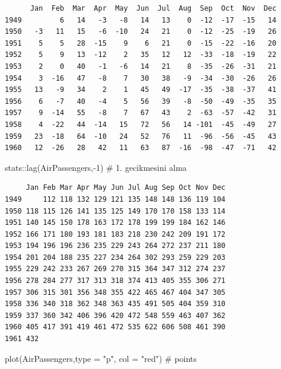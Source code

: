 \documentclass[
  letterpaper,
  DIV=11,
  numbers=noendperiod]{scrreprt}
\newenvironment{Shaded}{\begin{snugshade}}{\end{snugshade}}
\newcommand{\AttributeTok}[1]{\textcolor[rgb]{0.40,0.45,0.13}{#1}}
\newcommand{\CommentTok}[1]{\textcolor[rgb]{0.37,0.37,0.37}{#1}}
\newcommand{\DecValTok}[1]{\textcolor[rgb]{0.68,0.00,0.00}{#1}}
\newcommand{\FunctionTok}[1]{\textcolor[rgb]{0.28,0.35,0.67}{#1}}
\newcommand{\NormalTok}[1]{\textcolor[rgb]{0.00,0.23,0.31}{#1}}
\newcommand{\SpecialCharTok}[1]{\textcolor[rgb]{0.37,0.37,0.37}{#1}}
\newcommand{\StringTok}[1]{\textcolor[rgb]{0.13,0.47,0.30}{#1}}
\begin{document}
\begin{verbatim}
      Jan  Feb  Mar  Apr  May  Jun  Jul  Aug  Sep  Oct  Nov  Dec
1949         6   14   -3   -8   14   13    0  -12  -17  -15   14
1950   -3   11   15   -6  -10   24   21    0  -12  -25  -19   26
1951    5    5   28  -15    9    6   21    0  -15  -22  -16   20
1952    5    9   13  -12    2   35   12   12  -33  -18  -19   22
1953    2    0   40   -1   -6   14   21    8  -35  -26  -31   21
1954    3  -16   47   -8    7   30   38   -9  -34  -30  -26   26
1955   13   -9   34    2    1   45   49  -17  -35  -38  -37   41
1956    6   -7   40   -4    5   56   39   -8  -50  -49  -35   35
1957    9  -14   55   -8    7   67   43    2  -63  -57  -42   31
1958    4  -22   44  -14   15   72   56   14 -101  -45  -49   27
1959   23  -18   64  -10   24   52   76   11  -96  -56  -45   43
1960   12  -26   28   42   11   63   87  -16  -98  -47  -71   42
\end{verbatim}

\begin{Shaded}
\begin{Highlighting}[]
\NormalTok{stats}\SpecialCharTok{::}\FunctionTok{lag}\NormalTok{(AirPassengers,}\SpecialCharTok{{-}}\DecValTok{1}\NormalTok{) }\CommentTok{\# 1. gecikmesini alma}
\end{Highlighting}
\end{Shaded}

\begin{verbatim}
     Jan Feb Mar Apr May Jun Jul Aug Sep Oct Nov Dec
1949     112 118 132 129 121 135 148 148 136 119 104
1950 118 115 126 141 135 125 149 170 170 158 133 114
1951 140 145 150 178 163 172 178 199 199 184 162 146
1952 166 171 180 193 181 183 218 230 242 209 191 172
1953 194 196 196 236 235 229 243 264 272 237 211 180
1954 201 204 188 235 227 234 264 302 293 259 229 203
1955 229 242 233 267 269 270 315 364 347 312 274 237
1956 278 284 277 317 313 318 374 413 405 355 306 271
1957 306 315 301 356 348 355 422 465 467 404 347 305
1958 336 340 318 362 348 363 435 491 505 404 359 310
1959 337 360 342 406 396 420 472 548 559 463 407 362
1960 405 417 391 419 461 472 535 622 606 508 461 390
1961 432                                            
\end{verbatim}

\begin{Shaded}
\begin{Highlighting}[]
\FunctionTok{plot}\NormalTok{(AirPassengers,}\AttributeTok{type =} \StringTok{"p"}\NormalTok{, }\AttributeTok{col =} \StringTok{"red"}\NormalTok{) }\CommentTok{\# points}
\end{Highlighting}
\end{Shaded}
\end{document}
